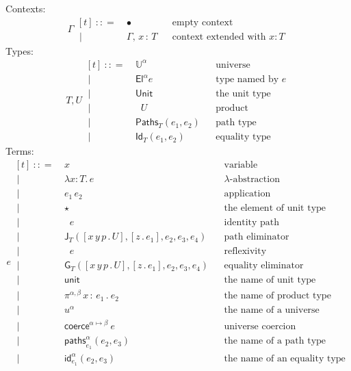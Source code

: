 \documentclass{article}
\newcommand{\G}{\Gamma} %
\newcommand{\T}{T} %
\newcommand{\U}{U} %
\newcommand{\x}{x} %
\newcommand{\e}{e} %
\newcommand{\bnf}{\ \mathrel{{:}{:}{=}}\ }
\newcommand{\bnfor}{\ \mid\ \ }
\newcommand{\ctxempty}{\bullet} %
\newcommand{\ctxextend}[3]{#1,\, #2\, {:}\, #3} %
\newcommand{\Universe}[1]{\mathbb{U}^{#1}} %
\newcommand{\El}[2]{\mathsf{El}^{#1} #2} %
\newcommand{\Unit}{\mathsf{Unit}} %
\newcommand{\Prod}[2]{\mathop{\textstyle\prod_{(#1 {:} #2)}}} %
\newcommand{\lam}[2]{\lambda #1 {:} #2 .\,} %
\newcommand{\app}[2]{#1\,#2} %
\newcommand{\abst}[2]{[#1 \,.\, #2]} %
\newcommand{\unitTerm}{\star} %
\newcommand{\coerce}[3]{\mathsf{coerce}^{#2{\mapsto}#3}\ #1}
\newcommand{\PrEqual}[3]{\mathsf{Paths}_{#1}(#2,#3)} %
\newcommand{\JuEqual}[3]{\mathsf{Id}_{#1}(#2,#3)} %
\newcommand{\PrElim}[6]{\mathsf{J}_{#1}(#2, #3, #4, #5, #6)} %
\newcommand{\JuElim}[6]{\mathsf{G}_{#1}(#2, #3, #4, #5, #6)} %
\newcommand{\prRefl}[1]{\mathop{\mathsf{idpath}_{#1}}}  %
\newcommand{\juRefl}[1]{\mathop{\mathsf{refl}_{#1}}}    %
\newcommand{\nUnit}{\mathsf{unit}} %
\newcommand{\nProd}[3]{\pi^{#1} \,#2\,{:}\,#3 \,.\ } %
\newcommand{\nUniverse}[1]{u^{#1}}  %
\newcommand{\nPrEqual}[4]{\mathsf{paths}^{#1}_{#2}(#3,#4)} %
\newcommand{\nJuEqual}[4]{\mathsf{id}^{#1}_{#2}(#3,#4)} %
\begin{document}
Contexts:
%
\begin{equation*}
  \G
  \begin{aligned}[t]
    \bnf   {}& \ctxempty & & \text{empty context}\\
    \bnfor {}& \ctxextend{\G}{\x}{\T} & & \text{context extended with $x : T$}
  \end{aligned}
\end{equation*}
%
Types:
%
\begin{equation*}
  \T, \U
  \begin{aligned}[t]
    \bnf   {}& \Universe{\alpha} & & \text{universe}\\
    \bnfor {}& \El{\alpha}{\e} & & \text{type named by $e$}\\
    \bnfor {}& \Unit & & \text{the unit type}\\
    \bnfor {}& \Prod{x}{\T} \U & & \text{product}\\
    \bnfor {}& \PrEqual{T}{\e_1}{\e_2} & & \text{path type}\\
    \bnfor {}& \JuEqual{T}{\e_1}{\e_2} & & \text{equality type}
  \end{aligned}
\end{equation*}
%
Terms:
%
\begin{equation*}
  \e
  \begin{aligned}[t]
    \bnf   {}&  \x   &&\text{variable} \\
    \bnfor {}&  \lam{\x}{\T} \e  &&\text{$\lambda$-abstraction} \\
    \bnfor {}&   \app{\e_1}{\e_2}  &&\text{application} \\
    \bnfor {}&  \unitTerm  &&\text{the element of unit type} \\
    \bnfor {}&  \prRefl{\T}{\e}  &&\text{identity path} \\
    \bnfor {}&  \PrElim{\T}{\abst{x\,y\,p}{\U}}{\abst{z}{\e_1}}{\e_2}{\e_3}{\e_4}  &&\text{path eliminator} \\
    \bnfor {}&  \juRefl{\T}{\e}  &&\text{reflexivity} \\
    \bnfor {}&  \JuElim{\T}{\abst{x\,y\,p}{\U}}{\abst{z}{\e_1}}{\e_2}{\e_3}{\e_4}  &&\text{equality eliminator} \\
    \bnfor {}&  \nUnit  &&\text{the name of unit type} \\
    \bnfor {}&  \nProd{\alpha,\beta}{\x}{\e_1} \e_2  &&\text{the name of product type} \\
    \bnfor {}&  \nUniverse{\alpha} &&\text{the name of a universe} \\
    \bnfor {}&  \coerce{\e}{\alpha}{\beta}  &&\text{universe coercion} \\
    \bnfor {}&  \nPrEqual{\alpha}{\e_1}{\e_2}{\e_3}  &&\text{the name of a path type} \\
    \bnfor {}&  \nJuEqual{\alpha}{\e_1}{\e_2}{\e_3}  &&\text{the name of an equality type}
  \end{aligned}
\end{equation*}
\end{document}
